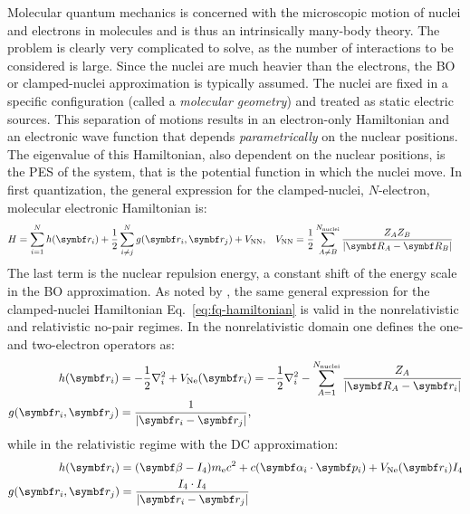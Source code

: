 Molecular quantum mechanics is concerned with the microscopic motion of
nuclei and electrons in molecules and is thus an intrinsically many-body
theory. The problem is clearly very complicated to solve, as the number of
interactions to be considered is large.
Since the nuclei are much heavier than the electrons, the \gls{BO} or
clamped-nuclei approximation is typically assumed. The nuclei are fixed
in a specific configuration (called a \emph{molecular geometry}) and
treated as static electric sources.\autocite{Born1927-ce}
This separation of motions results in an electron-only Hamiltonian and
an electronic wave function that depends \emph{parametrically} on the
nuclear positions. The eigenvalue of this Hamiltonian, also dependent on
the nuclear positions, is the \gls{PES} of the system, that is the
potential function in which the nuclei move.\autocite{Szabo1989-vl,
McWeeny1992-oj}
In first quantization, the general expression for the clamped-nuclei,
$N$-electron, molecular electronic Hamiltonian is:
\begin{alignat}{2}\label{eq:fq-hamiltonian}
  H = \sum_{i=1}^N h(\vect{r}_i)
  + \frac{1}{2}\sum_{i\neq j}^N g(\vect{r}_i, \vect{r}_j)
  + V_\mathrm{NN},
  \quad&
  V_\mathrm{NN} =
  \frac{1}{2}\sum_{A \neq B}^{N_\mathrm{nuclei}}\frac{Z_A Z_B}{|\vect{R}_A - \vect{R}_B|}
\end{alignat}
The last term is the nuclear repulsion energy, a constant shift of the
energy scale in the \acrshort{BO} approximation.
As noted by \citeauthor{Saue2011-qg}, the same general expression for
the clamped-nuclei Hamiltonian Eq.~\eqref{eq:fq-hamiltonian} is valid in
the nonrelativistic and relativistic no-pair
regimes.\autocite{Sucher1980-vf, Saue2011-qg}
In the nonrelativistic domain one defines the one- and two-electron
operators as:\autocite{Szabo1989-vl, McWeeny1992-oj, Konishi2009-zb}
\begin{subequations}
 \begin{align}
   h(\vect{r}_i) &=
   -\frac{1}{2}\nabla^2_i + V_\mathrm{Ne}(\vect{r}_i)
   = -\frac{1}{2}\nabla^2_i - \sum_{A=1}^{N_\mathrm{nuclei}}\frac{Z_A}{|\vect{R}_A -
   \vect{r}_i|} \label{eq:h} \\
   g(\vect{r}_i, \vect{r}_j) &= \frac{1}{|\vect{r}_i - \vect{r}_j|},
   \label{eq:g-coulomb}
 \end{align}
\end{subequations}
while in the relativistic regime with the \gls{DC}
approximation:\autocite{Dyall2007-tu, Konishi2009-zb, Reiher2014-cp}
\begin{subequations}
 \begin{align}
   h(\vect{r}_i) &= (\mat{\beta} - I_4)\si{\electronmass}c^2 +
   c(\mat{\alpha}_i\cdot\vect{p}_i) + V_{\mathrm{Ne}}(\vect{r}_i)I_4 \\
   g(\vect{r}_i, \vect{r}_j) &= \frac{I_4\cdot I_4}{|\vect{r}_i - \vect{r}_j|}
   \label{eq:g-r-coulomb}
 \end{align}
\end{subequations}
